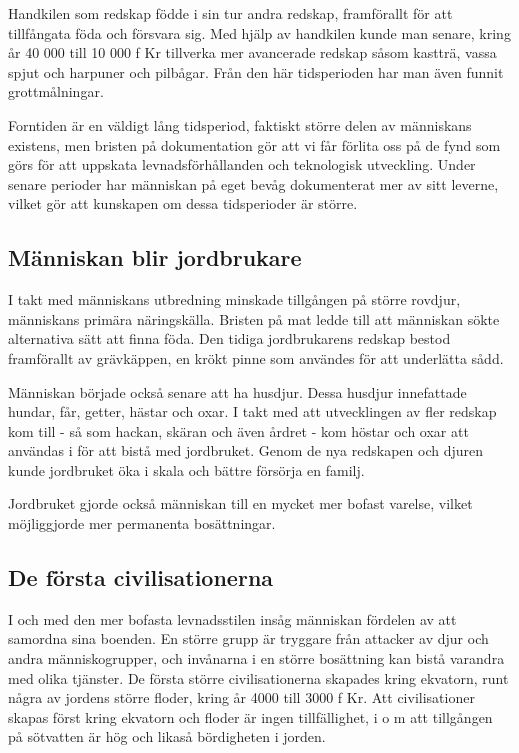 \documentclass[a4paper,12pt,fleqn]{article}
\begin{document}
Handkilen som redskap födde i sin tur andra redskap, framförallt för att tillfångata föda och försvara sig. Med hjälp av handkilen kunde man senare, kring år 40 000 till 10 000 f Kr tillverka mer avancerade redskap såsom kastträ, vassa spjut och harpuner och pilbågar. Från den här tidsperioden har man även funnit grottmålningar.

Forntiden är en väldigt lång tidsperiod, faktiskt större delen av människans existens, men bristen på dokumentation gör att vi får förlita oss på de fynd som görs för att uppskata levnadsförhållanden och teknologisk utveckling. Under senare perioder har människan på eget bevåg dokumenterat mer av sitt leverne, vilket gör att kunskapen om dessa tidsperioder är större. 

\subsection{Människan blir jordbrukare}
I takt med människans utbredning minskade tillgången på större rovdjur, människans primära näringskälla. Bristen på mat ledde till att människan sökte alternativa sätt att finna föda. Den tidiga jordbrukarens redskap bestod framförallt av grävkäppen, en krökt pinne som användes för att underlätta sådd. 

Människan började också senare att ha husdjur. Dessa husdjur innefattade hundar, får, getter, hästar och oxar. I takt med att utvecklingen av fler redskap kom till - så som hackan, skäran och även årdret -  kom höstar och oxar att användas i för att bistå med jordbruket. Genom de nya redskapen och djuren kunde jordbruket öka i skala och bättre försörja en familj. 

Jordbruket gjorde också människan till en mycket mer bofast varelse, vilket möjliggjorde mer permanenta bosättningar. 

\subsection{De första civilisationerna}

I och med den mer bofasta levnadsstilen insåg människan fördelen av att samordna sina boenden. En större grupp är tryggare från attacker av djur och andra människogrupper, och invånarna i en större bosättning kan bistå varandra med olika tjänster. De första större civilisationerna skapades kring ekvatorn, runt några av jordens större floder, kring år 4000 till 3000 f Kr. Att civilisationer skapas först kring ekvatorn och floder är ingen tillfällighet, i o m att tillgången på sötvatten är hög och likaså bördigheten i jorden. 
\end{document}

